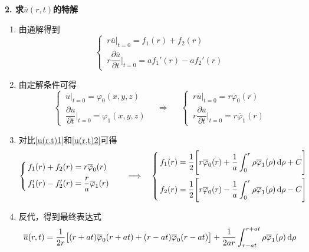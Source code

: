 \noindent \textbf{2. 求$\overline{u}(r,t)$的特解}
\begin{enumerate}[\hspace*{2em} (1) ]
	\item 由通解得到
	\begin{equation}
		\begin{cases}
			\, r \overline{u}\big|_{t = 0} = f_1(r) + f_2(r)\\[1em]
			\, r \dfrac{\partial \overline{u}}{\partial t}\Bigg|_{t = 0} = af_1'(r) -af_2'(r)
		\end{cases}
	\label{u(r,t)1}
	\end{equation}
	\item 由定解条件可得
	\begin{equation}
		\begin{cases}
			\, \overline{u}\big|_{t = 0} = \varphi_0(x,y,z)\\[1em]
			\, \dfrac{\partial \overline{u}}{\partial t}\Bigg|_{t = 0} = \varphi_1(x,y,z)
		\end{cases} \quad \Longrightarrow \quad \,\,
	\begin{cases}
		\, r \overline{u}\big|_{t = 0} = r\overline{\varphi}_0(r)\\[1em]
		\, r \dfrac{\partial \overline{u}}{\partial t}\Bigg|_{t = 0} = r\overline{\varphi}_1(r)
	\end{cases}
	\label{u(r,t)2}
	\end{equation}
	\item 对比\eqref{u(r,t)1}和\eqref{u(r,t)2}可得
	\begin{equation}
		\begin{cases}
			\,  f_1(r) + f_2(r) = r\overline{\varphi}_0(r)\\[0.5em]
			\, f_1'(r) -f_2'(r) = \dfrac{r}{a}\overline{\varphi}_1(r)
		\end{cases} \quad \Longrightarrow \quad
	\begin{cases}
		\, \displaystyle f_1(r) = \dfrac{1}{2}\Bigg[r\overline{\varphi}_0(r)  + \dfrac{1}{a} \int_0^r \rho \overline{\varphi}_1(\rho) \, {\rm{d}} \rho +C\Bigg]\\[1.2em]
		\, \displaystyle f_2(r) = \dfrac{1}{2}\Bigg[r\overline{\varphi}_0(r)  - \dfrac{1}{a} \int_0^r \rho \overline{\varphi}_1(\rho) \, {\rm{d}} \rho -C\Bigg]
	\end{cases}
	\end{equation}
	\item 反代，得到最终表达式
	\begin{equation}
		\overline{u}(r, t) = \dfrac{1}{2r}\big[(r+at)\overline{\varphi}_0(r+at) + (r-at)\overline{\varphi}_0 (r-at)\big]+ \dfrac{1}{2ar} \int_{r-at}^{r+at}\rho \overline{\varphi}_1(\rho)\, {\rm{d}} \rho 
		\label{u(r,t)}
	\end{equation}
\end{enumerate}

